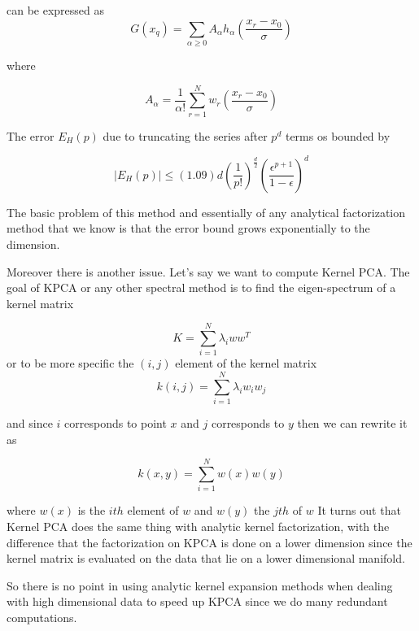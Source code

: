 \documentclass[12pt,letterpaper,doublespaced,ETD,dvips,proposal]{gtthesis}
\begin{document}
\begin{Body}
can be expressed as
\begin{equation}
  G(x_q)=\sum_{\alpha\geq 0} A_{\alpha} h_{\alpha}
  \left(\frac{x_r-x_0}{\sigma}\right)
\end{equation}

where

\begin{equation}
  A_{\alpha} = \frac{1}{\alpha!}
  \sum_{r=1}^{N}w_r\left(\frac{x_r-x_0}{\sigma}\right)
\end{equation}

The error $E_H(p)$ due to truncating the series after $p^d$ terms os
bounded by

\begin{equation}
|E_H(p)|\leq (1.09)d\left(\frac{1}{p!}\right)^{\frac{d}{2}}
\left(\frac{\epsilon^{p+1}}{1-\epsilon}\right)^d
\end{equation}

The basic problem of this method and essentially of any analytical
factorization method that we know is that the error bound grows
exponentially to the dimension.

Moreover there is another issue. Let's say we want to compute Kernel
PCA. The goal of KPCA or any other spectral method is to find the
eigen-spectrum of a kernel matrix

\begin{equation}
K = \sum_{i=1}^{N}\lambda_i ww^T
\end{equation}
or to be more specific the $(i, j)$ element of the kernel matrix
\begin{equation}
k(i,j)=\sum_{i=1}^{N}\lambda_i w_i w_j
\end{equation}

and since $i$ corresponds to point $x$ and $j$ corresponds to $y$
then we can rewrite it as

\begin{equation}
k(x,y)=\sum_{i=1}^{N}w(x)w(y)
\end{equation}

where $w(x)$ is the $ith$ element of $w$ and $w(y)$ the $jth$ of $w$
It turns out that  Kernel PCA does the same thing with analytic
kernel factorization, with the difference that the factorization on
KPCA is done on a lower dimension since the kernel matrix is
evaluated on the data that lie on a lower dimensional manifold.

So there is no point in using analytic kernel expansion methods when
dealing with high dimensional data to speed up KPCA since we do many
redundant computations.



\end{Body}
\end{document}
